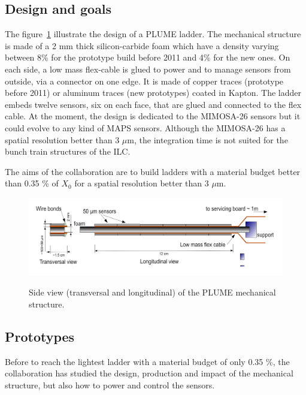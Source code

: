   

    \subsection{Design and goals}

    The figure~\ref{fig:PLUME} illustrate the design of a PLUME ladder.
    The mechanical structure is made of a 2 mm thick silicon-carbide foam which have a density varying between 8\% for the prototype build before 2011 and 4\% for the new ones.
    On each side, a low mass flex-cable is glued to power and to manage sensors from outside, via a connector on one edge.
    It is made of copper traces (prototype before 2011) or aluminum traces (new prototypes) coated in Kapton. 
    The ladder embeds twelve sensors, six on each face, that are glued and connected to the flex cable.
    At the moment, the design is dedicated to the MIMOSA-26 sensors but it could evolve to any kind of \gls{MAPS} sensors. 
    Although the MIMOSA-26 has a spatial resolution better than 3 $\mu$m, the integration time is not suited for the bunch train structures of the \gls{ILC}.

    The aims of the collaboration are to build ladders with a material budget better than 0.35 \% of $X_0$ for a spatial resolution better than 3 $\mu$m.

    \begin{figure}[!h]
      \centering
      \includegraphics[width = 15 cm]{Pictures/vxd/plume_finalGoal.png}
      \label{fig:PLUME}
      \caption{Side view (transversal and longitudinal) of the PLUME mechanical structure.}
    \end{figure}

    \subsection{Prototypes}

    Before to reach the lightest ladder with a material budget of only 0.35 \%, the collaboration has studied the design, production and impact of the mechanical structure, but also how to power and control the sensors.
    
